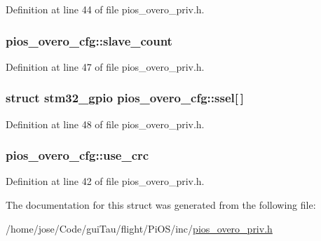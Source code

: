 Definition at line 44 of file pios\-\_\-overo\-\_\-priv.\-h.

\hypertarget{structpios__overo__cfg_a77972607cc3846ca93052fa2e4efdce3}{
\subsubsection[{slave\-\_\-count}]{ pios\-\_\-overo\-\_\-cfg\-::slave\-\_\-count}}\label{structpios__overo__cfg_a77972607cc3846ca93052fa2e4efdce3}


Definition at line 47 of file pios\-\_\-overo\-\_\-priv.\-h.

\hypertarget{structpios__overo__cfg_a900adf7a473ee816fb7044425cabd0de}{
\subsubsection[{ssel}]{\setlength{\rightskip}{0pt plus 5cm}struct {\bf stm32\-\_\-gpio} pios\-\_\-overo\-\_\-cfg\-::ssel\mbox{[}$\,$\mbox{]}}}\label{structpios__overo__cfg_a900adf7a473ee816fb7044425cabd0de}


Definition at line 48 of file pios\-\_\-overo\-\_\-priv.\-h.

\hypertarget{structpios__overo__cfg_afee45313c7db22563bb644ca87b79bac}{
\subsubsection[{use\-\_\-crc}]{ pios\-\_\-overo\-\_\-cfg\-::use\-\_\-crc}}\label{structpios__overo__cfg_afee45313c7db22563bb644ca87b79bac}


Definition at line 42 of file pios\-\_\-overo\-\_\-priv.\-h.



The documentation for this struct was generated from the following file\-:\begin{DoxyCompactItemize}
\item 
/home/jose/\-Code/gui\-Tau/flight/\-Pi\-O\-S/inc/\hyperlink{pios__overo__priv_8h}{pios\-\_\-overo\-\_\-priv.\-h}\end{DoxyCompactItemize}
